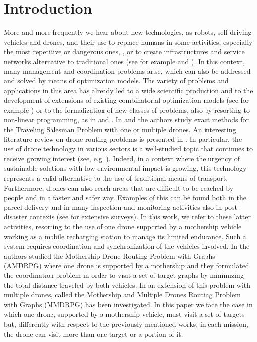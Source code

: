 \documentclass{itor}
\theoremstyle{definition}
\theoremstyle{remark}
\begin{document}
\maketitle


\section{Introduction}
More and more frequently we hear about new technologies, as robots, self-driving vehicles and drones, and their use to replace humans in some activities, especially the most repetitive or dangerous ones, \cite{art:Chui2016}, or to create infrastructures and service networks alternative to traditional ones (see for example \cite{art:Chiaraviglio2019a} and \cite{art:Amorosi2019}). In this context, many management and coordination problems arise, which can also be addressed and solved by means of optimization models. The variety of problems and applications in this area has already led to a wide scientific production and to the development of extensions of existing combinatorial optimization models (see for example \cite{art:Pugliese2017}) or to the formalization of new classes of problems, also by resorting to non-linear programming, as in \cite{art:Amorosi2021} and \cite{art:Amorosi2021b}. 
In \cite{art:Cavani2021} and \cite{art:Roberti2021, art:Coindreau2021} the authors study exact methods for the Traveling Salesman Problem with one or multiple drones. An interesting literature review on drone routing problems is presented in \cite{art:Macrina2020}.
In particular, the use of drone technology in various sectors is a well-studied topic that continues to receive growing interest (see, e.g. \cite{art:Coindreau2021,art:Amico2021, art:WANG, art:VIDAL, art:MBIA}). Indeed, in a context where the urgency of sustainable solutions with low environmental impact is growing, this technology represents a valid alternative to the use of traditional means of transport. Furthermore, drones can also reach areas that are difficult to be reached by people and in a faster and safer way. Examples of this can be found both in the parcel delivery and in many inspection and monitoring activities also in post-disaster contexts (see \cite{art:Otto2018, art:Chung2020, art:Rojas2020} for extensive surveys).
In this work, we refer to these latter activities, resorting to the use of one drone supported by a mothership vehicle working as a mobile recharging station to manage its limited endurance. Such a system requires coordination and synchronization of the vehicles involved. In \cite{art:Amorosi2021} the authors studied the Mothership Drone Routing Problem with Graphs (AMDRPG) where one drone is supported by a mothership and they formulated the coordination problem in order to visit a set of target graphs by minimizing the total distance traveled by both vehicles. In \cite{art:Amorosi2021b} an extension of this problem with multiple drones, called the Mothership and Multiple Drones Routing Problem with Graphs (MMDRPG) has been investigated. In this paper we face the case in which one drone, supported by a mothership vehicle, must visit a set of targets but, differently with respect to the previously mentioned works, in each mission, the drone can visit more than one target or a portion of it.
\end{document}
